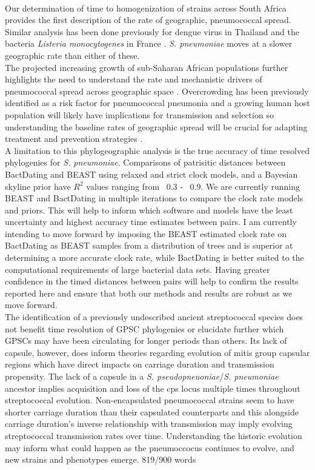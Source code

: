 \documentclass{article}
\begin{document}
 \\Our determination of time to homogenization of strains across South Africa provides the first description of the rate of geographic, pneumococcal spread. Similar analysis has been done previously for dengue virus in Thailand \cite{saljeDengueDiversitySpatial2017} and the bacteria \textit{Listeria monocytogenes} in France \cite{mouraEmergenceGlobalSpread2020}. \textit{S. pneumoniae} moves at a slower geographic rate than either of these. 
\\The projected increasing growth of sub-Saharan African populations further highlights the need to understand the rate and mechanistic drivers of pneumococcal spread across geographic space \cite{abubakarFutureMigrationHuman2020a}. Overcrowding has been previously identified as a risk factor for pneumococcal pneumonia and a growing human host population will likely have implications for transmission and selection so understanding the baseline rates of geographic spread will be crucial for adapting treatment and prevention strategies \cite{veraniRiskFactorsPresumed2016}. 
 \\A limitation to this phylogeographic analysis is the true accuracy of time resolved phylogenies for \textit{S. pneumoniae}. Comparisons of patrisitic distances between BactDating and BEAST using relaxed and strict clock models, and a Bayesian skyline prior have $R^2$ values ranging from ~0.3 - ~0.9.  We are currently running BEAST and BactDating in multiple iterations to compare the clock rate models and priors. This will help to inform which software and models have the least uncertainty and highest accuracy time estimates between pairs. I am currently intending to move forward by imposing the BEAST estimated clock rate on BactDating as BEAST samples from a distribution of trees and is superior at determining a more accurate clock rate, while BactDating is better suited to the computational requirements of large bacterial data sets. Having greater confidence in the timed distances between pairs will help to confirm the results reported here and ensure that both our methods and results are robust as we move forward. 
\\The identification of a previously undescribed ancient streptococcal species does not benefit time resolution of GPSC phylogenies or elucidate further which GPSCs may have been circulating for longer periods than others. Its lack of capsule, however, does inform theories regarding evolution of mitis group capsular regions which have direct impacts on carriage duration and transmission propensity. The lack of a capsule in a \textit{S. pseudopneuoniae}/\textit{S. pneumoniae} ancestor implies acquisition and loss of the cps locus multiple times throughout streptococcal evolution. Non-encapsulated pneumococcal strains seem to have shorter carriage duration than their capsulated counterparts and this alongside carriage duration's inverse relationship with transmission may imply evolving streptococcal transmission rates over time\cite{bradshawSelectivePressureRise2019
bradshawTransformationNonencapsulatedStreptococcus2020}. Understanding the historic evolution may inform what could happen as the pneumoccocus continues to evolve, and new strains and phenotypes emerge.
819/900 words
\end{document}
